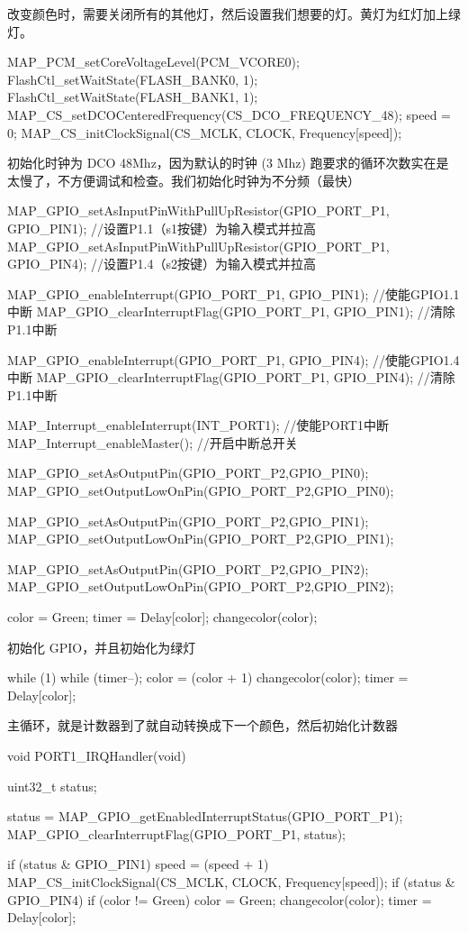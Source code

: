 \documentclass[a4paper,10pt,UTF8]{paper}
\numberwithin{equation}{section}
\numberwithin{figure}{section}
\begin{document}
改变颜色时，需要关闭所有的其他灯，然后设置我们想要的灯。黄灯为红灯加上绿灯。

\begin{ccode}
  MAP_PCM_setCoreVoltageLevel(PCM_VCORE0);    
  FlashCtl_setWaitState(FLASH_BANK0, 1);
  FlashCtl_setWaitState(FLASH_BANK1, 1);
  MAP_CS_setDCOCenteredFrequency(CS_DCO_FREQUENCY_48);
  speed = 0;
  MAP_CS_initClockSignal(CS_MCLK, CLOCK, Frequency[speed]); 
\end{ccode}

初始化时钟为 DCO 48Mhz，因为默认的时钟 (3 Mhz) 跑要求的循环次数实在是太慢了，不方便调试和检查。我们初始化时钟为不分频（最快）

\begin{ccode}
  MAP_GPIO_setAsInputPinWithPullUpResistor(GPIO_PORT_P1, GPIO_PIN1); 
   //设置P1.1（s1按键）为输入模式并拉高  
  MAP_GPIO_setAsInputPinWithPullUpResistor(GPIO_PORT_P1, GPIO_PIN4); 
   //设置P1.4（s2按键）为输入模式并拉高
  
  MAP_GPIO_enableInterrupt(GPIO_PORT_P1, GPIO_PIN1);  //使能GPIO1.1中断
  MAP_GPIO_clearInterruptFlag(GPIO_PORT_P1, GPIO_PIN1);   //清除P1.1中断 
  
  MAP_GPIO_enableInterrupt(GPIO_PORT_P1, GPIO_PIN4);  //使能GPIO1.4中断
  MAP_GPIO_clearInterruptFlag(GPIO_PORT_P1, GPIO_PIN4);   //清除P1.1中断 
  
  MAP_Interrupt_enableInterrupt(INT_PORT1); //使能PORT1中断
  MAP_Interrupt_enableMaster();  //开启中断总开关  
  
  MAP_GPIO_setAsOutputPin(GPIO_PORT_P2,GPIO_PIN0);
  MAP_GPIO_setOutputLowOnPin(GPIO_PORT_P2,GPIO_PIN0);
  
  MAP_GPIO_setAsOutputPin(GPIO_PORT_P2,GPIO_PIN1);
  MAP_GPIO_setOutputLowOnPin(GPIO_PORT_P2,GPIO_PIN1);
  
  MAP_GPIO_setAsOutputPin(GPIO_PORT_P2,GPIO_PIN2);
  MAP_GPIO_setOutputLowOnPin(GPIO_PORT_P2,GPIO_PIN2);
  
  color = Green;
  timer = Delay[color];
  changecolor(color);
\end{ccode}

初始化 GPIO，并且初始化为绿灯

\begin{ccode}
  while (1) {
    while (timer--);
    color = (color + 1) %
    changecolor(color);
    timer = Delay[color];
  }
\end{ccode}

主循环，就是计数器到了就自动转换成下一个颜色，然后初始化计数器

\begin{ccode}
  void PORT1_IRQHandler(void)
  {
    uint32_t status;

    status = MAP_GPIO_getEnabledInterruptStatus(GPIO_PORT_P1);
    MAP_GPIO_clearInterruptFlag(GPIO_PORT_P1, status);

    if (status & GPIO_PIN1) {
      speed = (speed + 1) %
      MAP_CS_initClockSignal(CS_MCLK, CLOCK, Frequency[speed]);
    }
    if (status & GPIO_PIN4) {
      if (color != Green) {
        color = Green;
        changecolor(color);
        timer = Delay[color];
      }
    }
  }
\end{ccode}
\end{document}
